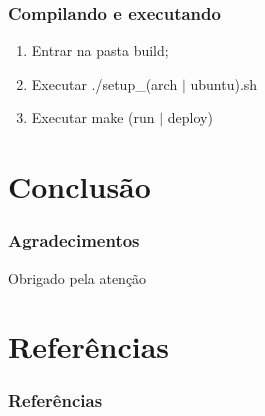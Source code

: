 \documentclass[12pt]{beamer}
\begin{document}
\begin{frame}
    \frametitle{Compilando e executando}
    \begin{enumerate}
        \item Entrar na pasta build;
        \item Executar ./setup\_(arch $|$ ubuntu).sh
        \item Executar make (run $|$ deploy)
    \end{enumerate}
\end{frame}

\section{Conclusão}
\begin{frame}
    \frametitle{Agradecimentos}
    \centering
    \Huge{Obrigado pela atenção}
\end{frame}

\section{Referências}\label{Referências}
\begin{frame}[allowframebreaks]
    \frametitle{Referências} 
    
\end{frame}
\end{document}
